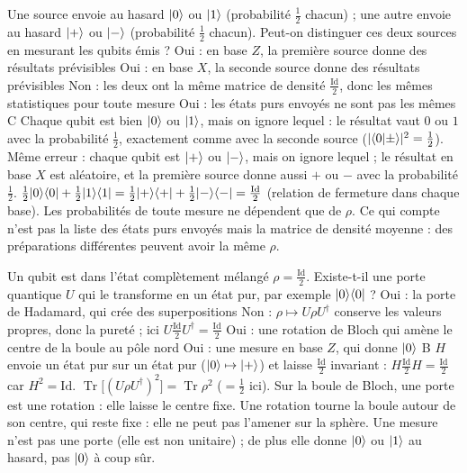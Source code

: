   {Une source envoie au hasard $|0\rangle$ ou $|1\rangle$ (probabilité $\frac12$ chacun) ; une autre envoie au hasard $|+\rangle$ ou $|-\rangle$ (probabilité $\frac12$ chacun). Peut-on distinguer ces deux sources en mesurant les qubits émis ?}
  {Oui : en base $Z$, la première source donne des résultats prévisibles}
  {Oui : en base $X$, la seconde source donne des résultats prévisibles}
  {Non : les deux ont la même matrice de densité $\frac{\mathrm{Id}}{2}$, donc les mêmes statistiques pour toute mesure}
  {Oui : les états purs envoyés ne sont pas les mêmes}
  {C}
\qcmx
  {Chaque qubit est bien $|0\rangle$ ou $|1\rangle$, mais on ignore lequel : le résultat vaut $0$ ou $1$ avec la probabilité $\frac12$, exactement comme avec la seconde source ($|\langle 0|\pm\rangle|^2=\frac12$).}
  {Même erreur : chaque qubit est $|+\rangle$ ou $|-\rangle$, mais on ignore lequel ; le résultat en base $X$ est aléatoire, et la première source donne aussi $+$ ou $-$ avec la probabilité $\frac12$.}
  {$\frac12|0\rangle\langle 0|+\frac12|1\rangle\langle 1|=\frac12|+\rangle\langle +|+\frac12|-\rangle\langle -|=\frac{\mathrm{Id}}2$ (relation de fermeture dans chaque base). Les probabilités de toute mesure ne dépendent que de $\rho$.}
  {Ce qui compte n'est pas la liste des états purs envoyés mais la matrice de densité moyenne : des préparations différentes peuvent avoir la même $\rho$.}

  {Un qubit est dans l'état complètement mélangé $\rho=\frac{\mathrm{Id}}{2}$. Existe-t-il une porte quantique $U$ qui le transforme en un état pur, par exemple $|0\rangle\langle 0|$ ?}
  {Oui : la porte de Hadamard, qui crée des superpositions}
  {Non : $\rho\mapsto U\rho U^\dagger$ conserve les valeurs propres, donc la pureté ; ici $U\frac{\mathrm{Id}}{2}U^\dagger=\frac{\mathrm{Id}}{2}$}
  {Oui : une rotation de Bloch qui amène le centre de la boule au pôle nord}
  {Oui : une mesure en base $Z$, qui donne $|0\rangle$}
  {B}
\qcmx
  {$H$ envoie un état pur sur un état pur ($|0\rangle\mapsto|+\rangle$) et laisse $\frac{\mathrm{Id}}{2}$ invariant : $H\frac{\mathrm{Id}}2H=\frac{\mathrm{Id}}2$ car $H^2=\mathrm{Id}$.}
  {$\operatorname{Tr}\big[(U\rho U^\dagger)^2\big]=\operatorname{Tr}\rho^2$ ($=\frac12$ ici). Sur la boule de Bloch, une porte est une rotation : elle laisse le centre fixe.}
  {Une rotation tourne la boule autour de son centre, qui reste fixe : elle ne peut pas l'amener sur la sphère.}
  {Une mesure n'est pas une porte (elle est non unitaire) ; de plus elle donne $|0\rangle$ ou $|1\rangle$ au hasard, pas $|0\rangle$ à coup sûr.}

